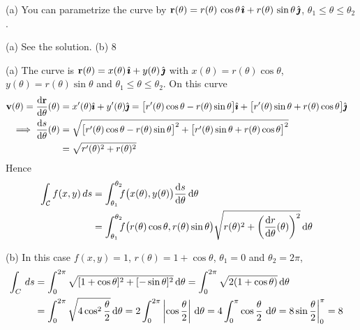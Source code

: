 \begin{hint}
(a) You can parametrize the curve by 
   $\mathbf{r}(\theta) = r(\theta)\,\cos\theta\,\hat{\pmb{\imath}} +
                  r(\theta)\,\sin\theta\,\hat{\pmb{\jmath}}$, $\theta_1\le \theta\le\theta_2$.
\end{hint}

\begin{answer}
(a) See the solution.\qquad
(b) $8$
\end{answer}

\begin{solution}
(a) The curve is 
$\mathbf{r}(\theta) = x(\theta)\,\hat{\pmb{\imath}}+ y(\theta)\,\hat{\pmb{\jmath}}$
with $x(\theta)=r(\theta)\cos\theta$, $y(\theta)=r(\theta)\sin\theta$ 
and $\theta_1\le \theta\le \theta_2$.
On this curve 
\begin{align*}
\vv(\theta) =\diff{\vr}{\theta}(\theta)&= x'(\theta)\hi+ y'(\theta)\hj
=\big[r'(\theta)\cos\theta-r(\theta)\sin\theta\big]\hi+
\big[r'(\theta)\sin\theta+r(\theta)\cos\theta\big]\hj\cr
\implies  \diff{s}{\theta}(\theta)
&=\sqrt{\big[r'(\theta)\cos\theta-r(\theta)\sin\theta\big]^2
+ \big[r'(\theta)\sin\theta+r(\theta)\cos\theta\big]^2}\cr
&=\sqrt{r'(\theta)^2+r(\theta)^2}
\end{align*}
Hence
\begin{align*}
\int_\cC f(x,y)\,ds 
&= \int_{\theta_1}^{\theta_2}\!\!\!f\big(x(\theta), y(\theta)\big) \diff{s}{\theta}\,\dee{\theta}
\cr
&=\int_{\theta_1}^{\theta_2}\!\!\!f\big(r(\theta)\cos\theta, r(\theta)\sin\theta\big) \sqrt{r(\theta)^2
     +\left(\diff{r}{\theta}(\theta)\right)^2}\,
\dee{\theta}
\end{align*}

(b)
In this case $f(x,y)=1$, $r(\theta)=1+\cos\theta$, $\theta_1=0$ and $\theta_2=2\pi$,
\begin{align*}
\int_C \,ds
&=\int_0^{2\pi} \sqrt{[1+\cos\theta]^2+[-\sin\theta]^2}\,\mathrm{d}\theta
=\int_0^{2\pi} \sqrt{2(1+\cos\theta)}\,\mathrm{d}\theta\cr
&=\int_0^{2\pi} \sqrt{4\cos^2\frac{\theta}{2}}\,\mathrm{d}\theta
=2\int_0^{2\pi} \left|\cos\frac{\theta}{2}\right|\,\mathrm{d}\theta
=4\int_0^{\pi} \cos\frac{\theta}{2}\ \mathrm{d}\theta
=8 \sin\frac{\theta}{2}\bigg|_0^{\pi}
=8
\end{align*}
\end{solution}


